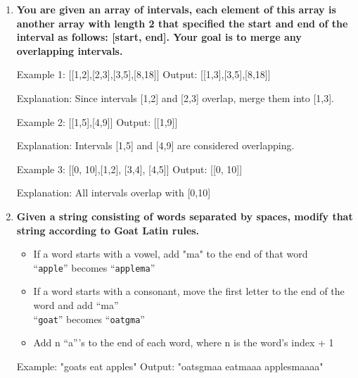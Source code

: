 \begin{enumerate}
\begin{console}
Example 2: [3, 2, 1, 0, 4]
Output:    false
\end{console}\newpage

\item \textbf{You are given an array of intervals, each element of this array is another array with length 2 that specified the start and end of the interval as follows: [start, end]. Your goal is to merge any overlapping intervals.}

\begin{console}
Example 1: [[1,2],[2,3],[3,5],[8,18]]
Output:    [[1,3],[3,5],[8,18]]

Explanation: Since intervals [1,2] and [2,3] overlap, merge them into [1,3].

Example 2: [[1,5],[4,9]]
Output:    [[1,9]]

Explanation: Intervals [1,5] and [4,9] are considered overlapping.

Example 3: [[0, 10],[1,2], [3,4], [4,5]]
Output:    [[0, 10]]

Explanation: All intervals overlap with [0,10]
\end{console}\newpage

\item \textbf{Given a string consisting of words separated by spaces, modify that string according to Goat Latin rules.}          
\begin{itemize}
\item If a word starts with a vowel, add "ma" to the end of that word\\
  ``\texttt{apple}'' becomes ``\texttt{applema}''
\item If a word starts with a consonant, move the first letter to the end of the word and add ``ma''\\
  ``\texttt{goat}'' becomes ``\texttt{oatgma}''
\item Add n ``a'''s to the end of each word, where n is the word's index + 1
\end{itemize}

\begin{console}
  Example: "goats eat apples"
  Output: "oatsgmaa eatmaaa applesmaaaa"
\end{console}\newpage

\end{enumerate}
